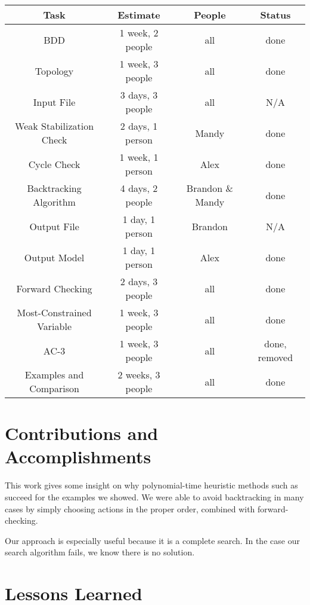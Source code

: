 \begin{center}
\begin{tabular}{|c||c|c|c|}
\hline
 Task & Estimate & People & Status \\
\hline
 BDD & 1 week, 2 people & all & done \\
 Topology & 1 week, 3 people & all & done \\
 Input File & 3 days, 3 people & all & N/A \\
 Weak Stabilization Check & 2 days, 1 person & Mandy & done \\
 Cycle Check & 1 week, 1 person & Alex & done \\
 Backtracking Algorithm & 4 days, 2 people & Brandon \& Mandy & done \\
 Output File & 1 day, 1 person &  Brandon & N/A \\
 Output Model & 1 day, 1 person & Alex & done \\
 Forward Checking & 2 days, 3 people & all & done \\
 Most-Constrained Variable & 1 week, 3 people & all & done \\
 AC-3 & 1 week, 3 people & all & done, removed \\
 Examples and Comparison & 2 weeks, 3 people & all & done \\
\hline
\end{tabular}
\end{center}

\section{Contributions and Accomplishments}

This work gives some insight on why polynomial-time heuristic methods such as \cite{ipdpsEbnenasir11} succeed for the examples we showed.
We were able to avoid backtracking in many cases by simply choosing actions in the proper order, combined with forward-checking.

Our approach is especially useful because it is a complete search.
In the case our search algorithm fails, we know there is no solution.

\section{Lessons Learned}

